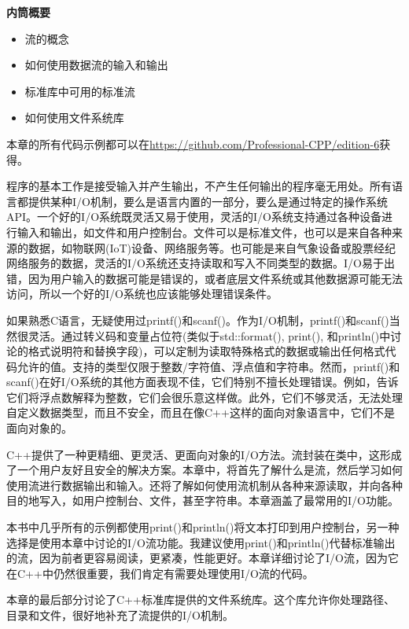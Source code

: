 \noindent
\textbf{内筒概要}

\begin{itemize}
\item
流的概念

\item
如何使用数据流的输入和输出

\item
标准库中可用的标准流

\item
如何使用文件系统库
\end{itemize}

本章的所有代码示例都可以在\url{https://github.com/Professional-CPP/edition-6}获得。

程序的基本工作是接受输入并产生输出，不产生任何输出的程序毫无用处。所有语言都提供某种I/O机制，要么是语言内置的一部分，要么是通过特定的操作系统API。一个好的I/O系统既灵活又易于使用，灵活的I/O系统支持通过各种设备进行输入和输出，如文件和用户控制台。文件可以是标准文件，也可以是来自各种来源的数据，如物联网(IoT)设备、网络服务等。也可能是来自气象设备或股票经纪网络服务的数据，灵活的I/O系统还支持读取和写入不同类型的数据。I/O易于出错，因为用户输入的数据可能是错误的，或者底层文件系统或其他数据源可能无法访问，所以一个好的I/O系统也应该能够处理错误条件。

如果熟悉C语言，无疑使用过printf()和scanf()。作为I/O机制，printf()和scanf()当然很灵活。通过转义码和变量占位符(类似于std::format(), print(), 和println()中讨论的格式说明符和替换字段)，可以定制为读取特殊格式的数据或输出任何格式代码允许的值。支持的类型仅限于整数/字符值、浮点值和字符串。然而，printf()和scanf()在好I/O系统的其他方面表现不佳，它们特别不擅长处理错误。例如，告诉它们将浮点数解释为整数，它们会很乐意这样做。此外，它们不够灵活，无法处理自定义数据类型，而且不安全，而且在像C++这样的面向对象语言中，它们不是面向对象的。

C++提供了一种更精细、更灵活、更面向对象的I/O方法。流封装在类中，这形成了一个用户友好且安全的解决方案。本章中，将首先了解什么是流，然后学习如何使用流进行数据输出和输入。还将了解如何使用流机制从各种来源读取，并向各种目的地写入，如用户控制台、文件，甚至字符串。本章涵盖了最常用的I/O功能。

本书中几乎所有的示例都使用print()和println()将文本打印到用户控制台，另一种选择是使用本章中讨论的I/O流功能。我建议使用print()和println()代替标准输出的流，因为前者更容易阅读，更紧凑，性能更好。本章详细讨论了I/O流，因为它在C++中仍然很重要，我们肯定有需要处理使用I/O流的代码。

本章的最后部分讨论了C++标准库提供的文件系统库。这个库允许你处理路径、目录和文件，很好地补充了流提供的I/O机制。










